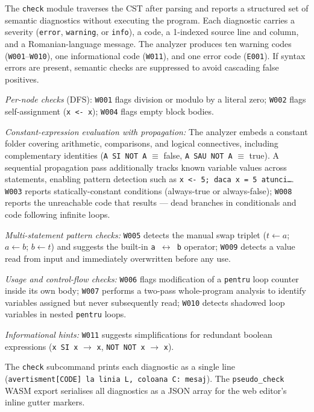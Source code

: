 \documentclass[conference]{IEEEtran}
\begin{document}
The \texttt{check} module traverses the CST after parsing and reports a
structured set of semantic diagnostics without executing the program.
Each diagnostic carries a severity (\texttt{error}, \texttt{warning}, or
\texttt{info}), a code, a 1-indexed source line and column, and a
Romanian-language message.  The analyzer produces ten warning codes
(\texttt{W001}--\texttt{W010}), one informational code (\texttt{W011}),
and one error code (\texttt{E001}).  If syntax errors are present, semantic
checks are suppressed to avoid cascading false positives.

\emph{Per-node checks} (DFS):
\texttt{W001} flags division or modulo by a literal zero;
\texttt{W002} flags self-assignment (\texttt{x <- x});
\texttt{W004} flags empty block bodies.

\emph{Constant-expression evaluation with propagation:}
The analyzer embeds a constant folder covering arithmetic, comparisons,
and logical connectives, including complementary identities
(\texttt{A SI NOT A} $\equiv$ false, \texttt{A SAU NOT A} $\equiv$ true).
A sequential propagation pass additionally tracks known variable values
across statements, enabling pattern detection such as \texttt{x <- 5;
daca x = 5 atunci\ldots}.
\texttt{W003} reports statically-constant conditions (always-true or
always-false); \texttt{W008} reports the unreachable code that results ---
dead branches in conditionals and code following infinite loops.

\emph{Multi-statement pattern checks:}
\texttt{W005} detects the manual swap triplet
($t \leftarrow a$; $a \leftarrow b$; $b \leftarrow t$)
and suggests the built-in \texttt{a $\leftrightarrow$ b} operator;
\texttt{W009} detects a value read from input and immediately overwritten
before any use.

\emph{Usage and control-flow checks:}
\texttt{W006} flags modification of a \texttt{pentru} loop counter inside
its own body; \texttt{W007} performs a two-pass whole-program analysis to
identify variables assigned but never subsequently read;
\texttt{W010} detects shadowed loop variables in nested \texttt{pentru} loops.

\emph{Informational hints:}
\texttt{W011} suggests simplifications for redundant boolean expressions
(\texttt{x SI x} $\to$ \texttt{x}, \texttt{NOT NOT x} $\to$ \texttt{x}).

The \texttt{check} subcommand prints each diagnostic as a single line
(\texttt{avertisment[CODE] la linia L, coloana C: mesaj}).  The
\texttt{pseudo\_check} WASM export serialises all diagnostics as a JSON
array for the web editor's inline gutter markers.
\end{document}
